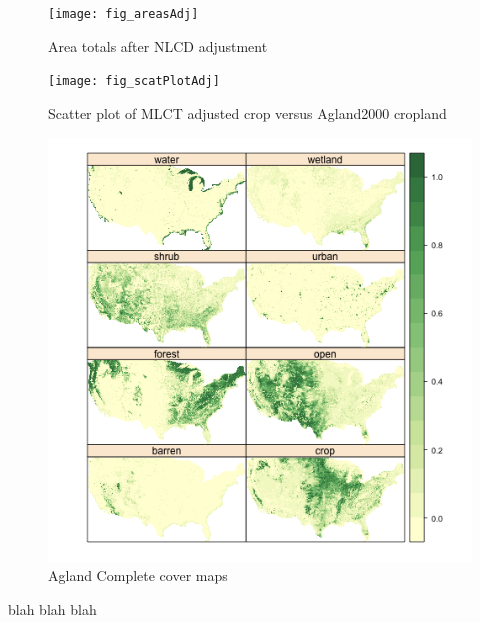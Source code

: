 \begin{figure}[hpt]
  \centering


  \texttt{[image: fig\_areasAdj]}
  \caption{Area totals after NLCD adjustment}
  \label{fig:areasAdj}
\end{figure}

\begin{figure}[hpt] 
  \begin{center} 


    \texttt{[image: fig\_scatPlotAdj]}
  \end{center} 
  \caption{Scatter plot of MLCT adjusted crop versus Agland2000 cropland}
  \label{fig:scatPlotAdj} 
\end{figure} 




\begin{figure}[hpt] 
\begin{center} 


\includegraphics{fig_agc}
\end{center} 
\caption{Agland Complete cover maps} 
\label{fig:agc} 
\end{figure} 



blah blah blah





